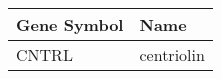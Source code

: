 \begin{tabular}{ll}
\toprule
Gene Symbol &       Name \\
\midrule
      CNTRL & centriolin \\
\bottomrule
\end{tabular}
